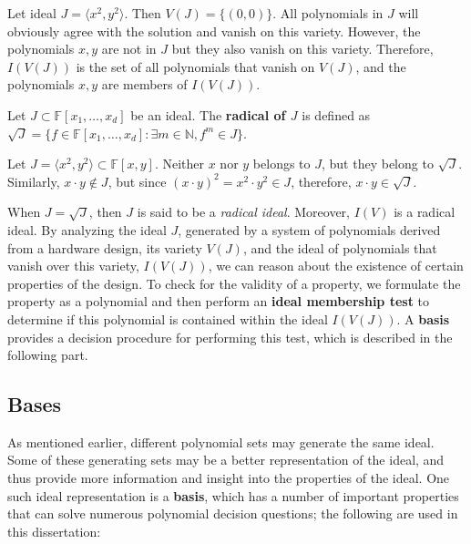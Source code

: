 \begin{Example}
	Let ideal $J=\langle x^{2},y^{2}\rangle$. Then $V(J)=\{(0,0)\}$.
	All polynomials in $J$ will obviously agree with the solution and vanish on this variety.
	However, the polynomials $x,y$ are not in $J$ but they also vanish on this variety. 
	Therefore, $I(V(J))$ is the set of all polynomials that vanish on $V(J)$, and the polynomials
	$x,y$ are members of $I(V(J))$.
\end{Example}

\begin{Definition}\label{def:radical}
Let $J \subset \mathbb{F}[x_1,\dots, x_d]$ be an ideal. The {\bf radical of $J$} is defined as $\sqrt{J} = \{f \in
\mathbb{F}[x_1,\dots, x_d]: \exists m \in \mathbb{N}, f^m \in J\}$. 
\end{Definition}

\begin{Example}
Let $J=\langle x^2,y^2\rangle \subset \mathbb{F}\left[x,y\right]$.
Neither $x$ nor $y$ belongs to $J$, but they belong to $\sqrt J$.
Similarly, $x\cdot y \notin J$, but since $(x \cdot y)^{2}=x^{2}\cdot y^{2}\in J$, therefore,
$x\cdot y \in \sqrt J$. 
\end{Example} 

When $J = \sqrt J$, then $J$ is said to be a 
{\it radical ideal}. Moreover, $I(V)$ is a radical ideal.
By analyzing the ideal $J$, generated by a system of polynomials derived 
from a hardware design, its variety $V(J)$, and the ideal of 
polynomials that vanish over this variety, $I(V(J))$, we can reason about the 
existence of certain properties of the design. To check for the validity of 
a property, we formulate the 
property as a polynomial and then perform an {\bf ideal membership test} to 
determine if this polynomial is contained within the ideal $I(V(J))$. 
A {\bf \Grobner basis} provides a decision procedure for performing this 
test, which is described in the following part. 

\subsection{\Grobner Bases}

As mentioned earlier, different polynomial sets may generate the same 
ideal. Some of these generating sets may be a better representation of 
the ideal, and thus provide more information and insight into the properties 
of the ideal. One such ideal representation is a {\bf \Grobner basis}, which has
a number of important properties that can solve numerous polynomial 
decision questions; the following are used in this dissertation:

